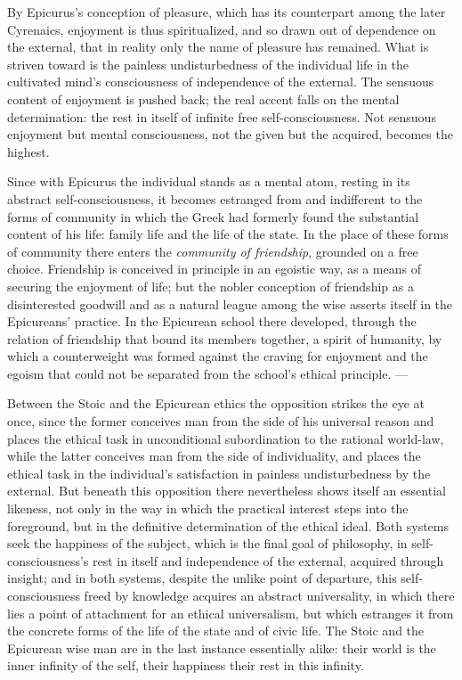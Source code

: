 By Epicurus's conception of pleasure, which has its counterpart among
the later Cyrenaics, enjoyment is thus spiritualized, and so drawn out
of dependence on the external, that in reality only the name of pleasure
has remained. What is striven toward is the painless
undisturbedness of the individual life in the cultivated
mind's consciousness of independence of the external. The sensuous
content of enjoyment is pushed back; the real accent falls on the
mental determination: the rest in itself of infinite free
self-consciousness. Not sensuous enjoyment but mental consciousness, not
the given but the acquired, becomes the highest.

Since with Epicurus the individual stands as a mental atom, resting in
its abstract self-consciousness, it becomes estranged from and
indifferent to the forms of community in which the Greek had formerly
found the substantial content of his life: family life and the life of
the state. In the place of these forms of community there enters the
\emph{community of friendship}, grounded on a free choice. Friendship is
conceived in principle in an egoistic way, as a means of securing the
enjoyment of life; but the nobler conception of friendship as a
disinterested goodwill and as a natural league among the wise asserts
itself in the Epicureans' practice. In the Epicurean school there
developed, through the relation of friendship that bound its members
together, a spirit of humanity, by which a counterweight was formed
against the craving for enjoyment and the egoism that could not be
separated from the school's ethical principle. ---

Between the Stoic and the Epicurean ethics the opposition strikes the
eye at once, since the former conceives man from the side of his
universal reason and places the ethical task in unconditional
subordination to the rational world-law, while the latter conceives man
from the side of individuality, and places the ethical task in the
individual's satisfaction in painless undisturbedness by the external.
But beneath this opposition there nevertheless shows itself an essential
likeness, not only in the way in which the practical interest steps into
the foreground, but in the definitive determination of the ethical
ideal. Both systems seek the happiness of the subject, which is the
final goal of philosophy, in self-consciousness's rest in itself and
independence of the external, acquired through insight; and in both
systems, despite the unlike point of departure, this self-consciousness
freed by knowledge acquires an abstract universality, in which
there lies a point of attachment for an ethical universalism,
but which estranges it from the concrete forms of the life of the state
and of civic life. The Stoic and the Epicurean wise man are in the last
instance essentially alike: their world is the inner infinity of the
self, their happiness their rest in this infinity.

